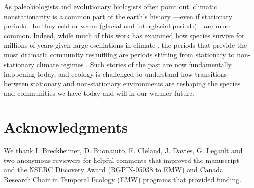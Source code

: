 \documentclass[11pt,letterpaper]{article}
\newcommand{\R}[1]{\label{#1}\linelabel{#1}}
\begin{document}
As paleobiologists and evolutionary biologists often point out, climatic nonstationarity is a common part of the earth's history \citep{Jansson:2002nz}---even if stationary periods---be they cold or warm (glacial and interglacial periods)---are more common. Indeed, while much of this work has examined how species survive for millions of years given large oscillations in climate \citep{provan2008}, the periods that provide the most dramatic community reshuffling are periods shifting from stationary to non-stationary climate regimes \citep{vrba1980,vrba1985}. Such stories of the past are now fundamentally happening today, and ecology is challenged to understand how transitions between stationary and non-stationary environments are reshaping the species and communities we have today and will in our warmer future. \R{nsfutend}

\section{Acknowledgments}
We thank I. Breckheimer, D. Buonaiuto, E. Cleland, J. Davies, G. Legault and two anonymous reviewers for helpful comments that improved the manuscript and the NSERC Discovery Award (RGPIN-05038 to EMW) and Canada Research Chair in Temporal Ecology (EMW) programs that provided funding. 


\end{document}
